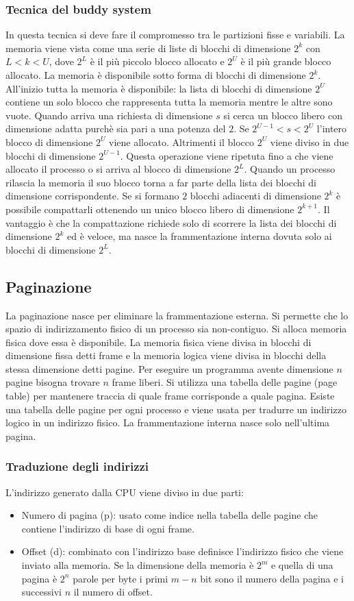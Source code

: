 \subsubsection{Tecnica del buddy system}
In questa tecnica si deve fare il compromesso tra le partizioni fisse e variabili. La memoria viene vista come una serie di liste di blocchi di dimensione $2^k$ con $L < k < U$, dove
$2^L$ \`e il pi\`u piccolo blocco allocato e $2^U$ \`e il pi\`u grande blocco allocato. La memoria \`e disponibile sotto forma di blocchi di dimensione $2^k$. All'inizio tutta la memoria
\`e disponibile: la lista di blocchi di dimensione $2^U$ contiene un solo blocco che rappresenta tutta la memoria mentre le altre sono vuote. Quando arriva una richiesta di dimensione $s$
si cerca un blocco libero con dimensione adatta purch\`e sia pari a una potenza del $2$. Se $2^{U-1} < s < 2^U$ l'intero blocco di dimensione $2^U$ viene allocato. Altrimenti il blocco 
$2^U$ viene diviso in due blocchi di dimensione $2^{U-1}$. Questa operazione viene ripetuta fino a che viene allocato il processo o si arriva al blocco di dimensione $2^L$. Quando
un processo rilascia la memoria il suo blocco torna a far parte della lista dei blocchi di dimensione corrispondente. Se si formano $2$ blocchi adiacenti di dimensione $2^k$ \`e 
possibile compattarli ottenendo un unico blocco libero di dimensione $2^{k+1}$. Il vantaggio \`e che la compattazione richiede solo di scorrere la lista dei blocchi di dimensione $2^k$
ed \`e veloce, ma nasce la frammentazione interna dovuta solo ai blocchi di dimensione $2^L$. 
\subsection{Paginazione}
La paginazione nasce per eliminare la frammentazione esterna. Si permette che lo spazio di indirizzamento fisico di un processo sia non-contiguo. Si alloca memoria fisica dove essa \`e
disponibile. La memoria fisica viene divisa in blocchi di dimensione fissa detti frame e la memoria logica viene divisa in blocchi della stessa dimensione detti pagine. Per eseguire
un programma avente dimensione $n$ pagine bisogna trovare $n$ frame liberi. Si utilizza una tabella delle pagine (page table) per mantenere traccia di quale frame corrisponde a quale
pagina. Esiste una tabella delle pagine per ogni processo e viene usata per tradurre un indirizzo logico in un indirizzo fisico. La frammentazione interna nasce solo nell'ultima pagina. 
\subsubsection{Traduzione degli indirizzi}
L'indirizzo generato dalla CPU viene diviso in due parti: 
\begin{itemize}
	\item Numero di pagina (p): usato come indice nella tabella delle pagine che contiene l'indirizzo di base di ogni frame. 
	\item Offset (d): combinato con l'indirizzo base definisce l'indirizzo fisico che viene inviato alla memoria. Se la dimensione della memoria \`e $2^m$ e quella di una pagina \`e
		$2^n$ parole per byte i primi $m-n$ bit sono il numero della pagina e i successivi $n$ il numero di offset. 
\end{itemize}

